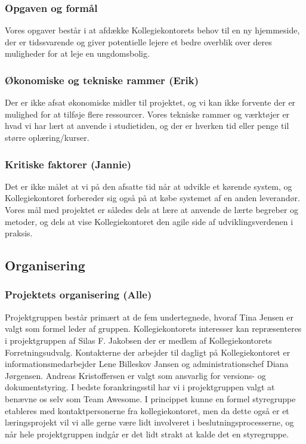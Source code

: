 \documentclass[12pt, a4paper]{report}
\begin{document}
\subsubsection{Opgaven og formål}
Vores opgaver består i at afdække Kollegiekontorets behov til en ny hjemmeside, der er tidssvarende og giver potentielle lejere et bedre overblik over deres muligheder for at leje en ungdomsbolig.

\subsubsection{Økonomiske og tekniske rammer (Erik)}
Der er ikke afsat økonomiske midler til projektet, og vi kan ikke forvente der er mulighed for at tilføje flere ressourcer. Vores tekniske rammer og værktøjer er hvad vi har lært at anvende i studietiden, og der er hverken tid eller penge til større oplæring/kurser.

\subsubsection{Kritiske faktorer (Jannie)}
Det er ikke målet at vi på den afsatte tid når at udvikle et kørende system, og Kollegiekontoret forbereder sig også på at købe systemet af en anden leverandør. Vores mål med projektet er således dels at lære at anvende de lærte begreber og metoder, og dels at vise Kollegiekontoret den agile side af udviklingsverdenen i praksis.

\subsection{Organisering}
\subsubsection{Projektets organisering (Alle)}
Projektgruppen består primært at de fem undertegnede, hvoraf Tina Jensen er valgt som formel leder af gruppen. Kollegiekontorets interesser kan repræsenteres i projektgruppen af Silas F. Jakobsen der er medlem af Kollegiekontorets Forretningsudvalg. Kontakterne der arbejder til dagligt på Kollegiekontoret er informationsmedarbejder Lene Billeskov Jansen og administrationschef Diana Jørgensen. Andreas Kristoffersen er valgt som ansvarlig for versions- og dokumentstyring. I bedste forankringsstil har vi i projektgruppen valgt at benævne os selv som Team Awesome.
I princippet kunne en formel styregruppe etableres med kontaktpersonerne fra kollegiekontoret, men da dette også er et læringsprojekt vil vi alle gerne være lidt involveret i beslutningsprocesserne, og når hele projektgruppen indgår er det lidt strakt at kalde det en styregruppe.
\end{document}
